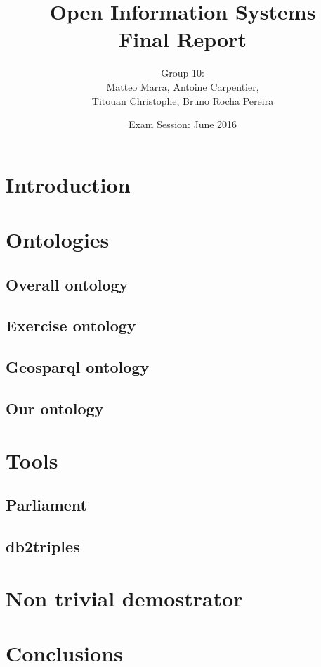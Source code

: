 \documentclass[11pt,a4paper]{article}
\author{Group 10: \\ Matteo Marra, Antoine Carpentier, \\Titouan Christophe, Bruno Rocha Pereira}
\title{Open Information Systems \\ Final Report}
\date{Exam Session: June 2016}
\begin{document}
\maketitle
\section{Introduction}
\section{Ontologies}
\subsection{Overall ontology}
\subsection{Exercise ontology}
\subsection{Geosparql ontology}
\subsection{Our ontology}
\section{Tools}
\subsection{Parliament}
\subsection{db2triples}
\section{Non trivial demostrator}
\section{Conclusions}
\end{document}
